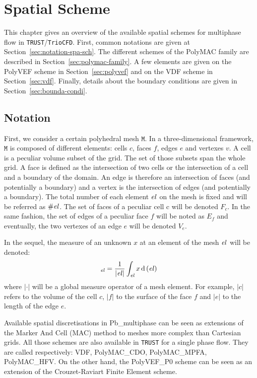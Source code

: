 \chapter{Spatial Scheme}
\label{sec:spatial_scheme}

This chapter gives an overview of the available spatial schemes for multiphase flow in \texttt{TRUST}/\texttt{TrioCFD}. First, common notations are given at Section~\ref{sec:notation-spa-sch}. The different schemes of the PolyMAC family are described in Section~\ref{sec:polymac-family}. A few elements are given on the PolyVEF scheme in Section~\ref{sec:polyvef} and on the VDF scheme in Section~\ref{sec:vdf}. Finally, details about the boundary conditions are given in Section~\ref{sec:bounda-condi}.

\section{Notation\label{sec:notation-spa-sch}}
First, we consider a certain polyhedral mesh $\mathtt{M}$. In a three-dimensional framework, $\mathtt{M}$ is composed of different elements: cells $c$, faces $f$, edges $e$ and vertexes $v$. A cell is a peculiar volume subset of the grid. The set of those subsets span the whole grid. A face is defined as the intersection of two cells or the intersection of a cell and a boundary of the domain. An edge is therefore an intersection of faces (and potentially a boundary) and a vertex is the intersection of edges (and potentially a boundary). The total number of each element $\mathit{el}{}$ on the mesh is fixed and will be referred as $\# \mathit{el}{}$. The set of faces of a peculiar cell c will be denoted $F_c$. In the same fashion, the set of edges of a peculiar face $f$ will be noted as $E_f$ and eventually, the two vertexes of an edge $e$ will be denoted $V_e$. 

In the sequel, the measure of an unknown $x$ at an element of the mesh $\mathit{el}{}$ will be denoted: 
\begin{equation}
    [x]_{\myel} = \frac{1}{|\myel|} \int_{\myel} x \, \text{d}\, (\myel)
\end{equation}
where $|\cdot|$ will be a global measure operator of a mesh element. For example, $|c|$ refers to the volume of the cell $c$, $|f|$ to the surface of the face $f$ and $|e|$ to the length of the edge $e$.

Available spatial discretisations in Pb\_multiphase can be seen as extensions of the Marker And Cell (MAC) method \cite{harlow1965numerical} to meshes more complex than Cartesian grids. All those schemes are also available in \texttt{TRUST} \cite{trustonline} for a single phase flow. They are called respectively: VDF, PolyMAC_CDO, PolyMAC\_MPFA, PolyMAC\_HFV. On the other hand, the PolyVEF\_P0 scheme can be seen as an extension of the Crouzet-Raviart Finite Element scheme.

